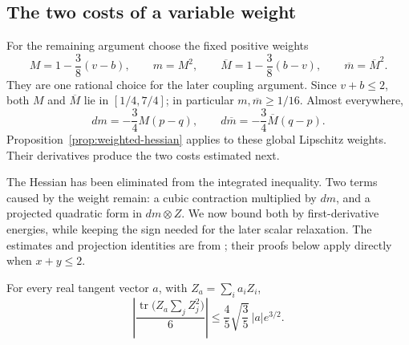 \subsection{The two costs of a variable weight}

For the remaining argument choose the fixed positive weights
\begin{equation}
 M=1-\frac38(v-b),\qquad m=M^2,
 \qquad
 \overline M=1-\frac38(b-v),\qquad \overline m=\overline M^2.
 \tag{12}\label{eq:12}
\end{equation}
They are one rational choice for the later coupling argument. Since
$v+b\le2$, both $M$ and $\overline M$ lie in $[1/4,7/4]$;
in particular $m,\overline m\ge1/16$.
Almost everywhere,
\[
 dm=-\frac34M(p-q),\qquad d\overline m=-\frac34\overline M(q-p).
\]
Proposition~\ref{prop:weighted-hessian} applies to these global Lipschitz
weights. Their derivatives produce the two costs estimated next.

The Hessian has been eliminated from the integrated inequality. Two
terms caused by the weight remain: a cubic contraction multiplied by
$dm$, and a projected quadratic form in $dm\otimes Z$. We now bound
both by first-derivative energies, while keeping the sign needed for
the later scalar relaxation. The estimates and projection identities are
from \cite[Lemmas~5.5--5.6 and Proposition~5.7]{OpenAI2026P}; their
proofs below apply directly when $x+y\le2$.

\begin{lemma}
\label{lem:cubic-contraction}
For every real tangent vector \(a\), with
\(Z_a=\sum_i a_iZ_i\),
\begin{equation}
 \left|\frac{\operatorname{tr}\bigl(Z_a\sum_jZ_j^2\bigr)}6\right|
 \le \frac45\sqrt{\frac35}\,|a|e^{3/2}.
 \tag{13}\label{eq:13}
\end{equation}
\end{lemma}


